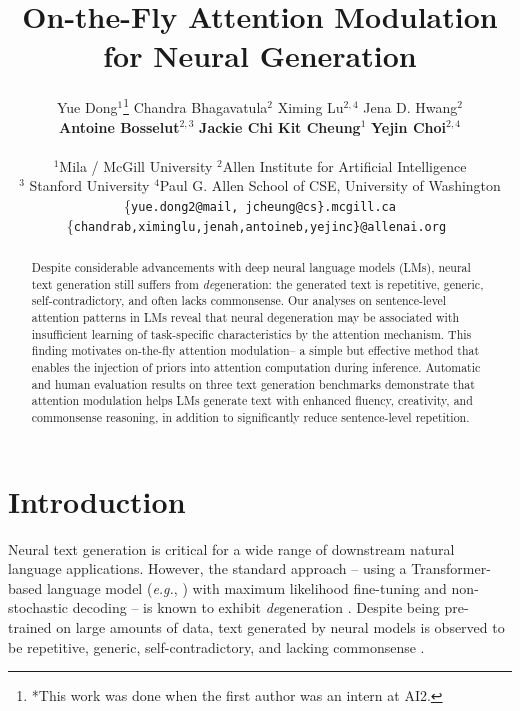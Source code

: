 \documentclass[11pt,a4paper]{article}
\title{
On-the-Fly Attention Modulation for Neural Generation
}
\author{Yue Dong$^1$\thanks{*This work was done when the first author was
an intern at AI2.} \quad Chandra Bhagavatula$^2$ \quad Ximing Lu$^{2,4}$ \quad Jena D. Hwang$^2$ \\\quad \textbf{Antoine Bosselut}$^{2,3}$ \quad
 \textbf{Jackie Chi Kit Cheung}$^1$  \quad \textbf{Yejin Choi}$^{2,4}$\\ \\
    $^1$Mila / McGill University \quad $^2$Allen Institute for Artificial Intelligence\\
    $^3$ Stanford University \quad $^4$Paul G. Allen School of CSE, University of Washington\\
    {\small \{\tt yue.dong2@mail, jcheung@cs\}.mcgill.ca} \\
    \small \{\tt  chandrab,ximinglu,jenah,antoineb,yejinc\}@allenai.org    }
\newcommand{\eg}{\textit{e.g.}}
\newcommand{\alg}{attention modulation}
\begin{document}
 \maketitle
\begin{abstract}
Despite considerable advancements with deep neural language models (LMs), neural text generation still suffers from \textit{de}generation: the generated text is repetitive, generic, self-contradictory, and often lacks commonsense. Our analyses on sentence-level attention patterns in LMs reveal that neural degeneration may be associated with insufficient learning of task-specific characteristics by the attention mechanism.  This finding motivates on-the-fly \alg{}\protect\footnotemark-- a simple but effective method that enables the injection of priors into attention computation during inference. Automatic and human evaluation results on three text generation benchmarks demonstrate that \alg{} helps LMs generate text with enhanced fluency, creativity, and commonsense reasoning, in addition to significantly reduce sentence-level repetition. 
\end{abstract}




\section{Introduction}


Neural text generation is critical for a wide range of downstream natural language applications. However, the standard approach -- using a Transformer-based \citep{Vaswani2017AttentionIA} language model (\eg, \citealp{radford2019language}) with maximum likelihood fine-tuning and non-stochastic decoding  – is known to exhibit \textit{de}generation \citep{welleck2020neural}. Despite being pre-trained on large amounts of data, text generated by neural models is observed to be repetitive, generic, self-contradictory, and lacking commonsense \citep{holtzman2020curious}.
\end{document}
